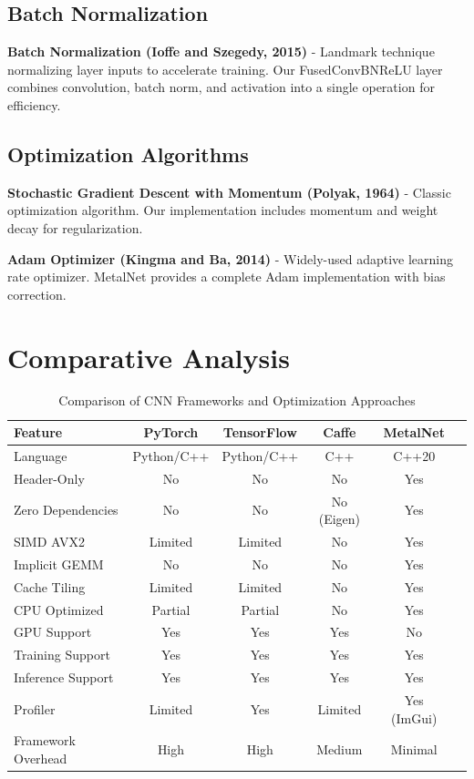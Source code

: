 \documentclass[12pt,oneside,a4paper]{report}
\begin{document}
\subsection{Batch Normalization}

\textbf{Batch Normalization (Ioffe and Szegedy, 2015)} - Landmark technique normalizing layer inputs to accelerate training. Our FusedConvBNReLU layer combines convolution, batch norm, and activation into a single operation for efficiency.

\subsection{Optimization Algorithms}

\textbf{Stochastic Gradient Descent with Momentum (Polyak, 1964)} - Classic optimization algorithm. Our implementation includes momentum and weight decay for regularization.

\textbf{Adam Optimizer (Kingma and Ba, 2014)} - Widely-used adaptive learning rate optimizer. MetalNet provides a complete Adam implementation with bias correction.

\section{Comparative Analysis}

\begin{table}[H]
\centering
\caption{Comparison of CNN Frameworks and Optimization Approaches}
\begin{tabular}{|l|c|c|c|c|c|}
\hline
\textbf{Feature} & \textbf{PyTorch} & \textbf{TensorFlow} & \textbf{Caffe} & \textbf{MetalNet} \\
\hline
Language & Python/C++ & Python/C++ & C++ & C++20 \\
\hline
Header-Only & No & No & No & Yes \\
\hline
Zero Dependencies & No & No & No (Eigen) & Yes \\
\hline
SIMD AVX2 & Limited & Limited & No & Yes \\
\hline
Implicit GEMM & No & No & No & Yes \\
\hline
Cache Tiling & Limited & Limited & No & Yes \\
\hline
CPU Optimized & Partial & Partial & No & Yes \\
\hline
GPU Support & Yes & Yes & Yes & No \\
\hline
Training Support & Yes & Yes & Yes & Yes \\
\hline
Inference Support & Yes & Yes & Yes & Yes \\
\hline
Profiler & Limited & Yes & Limited & Yes (ImGui) \\
\hline
Framework Overhead & High & High & Medium & Minimal \\
\hline
\end{tabular}
\end{table}
\end{document}
